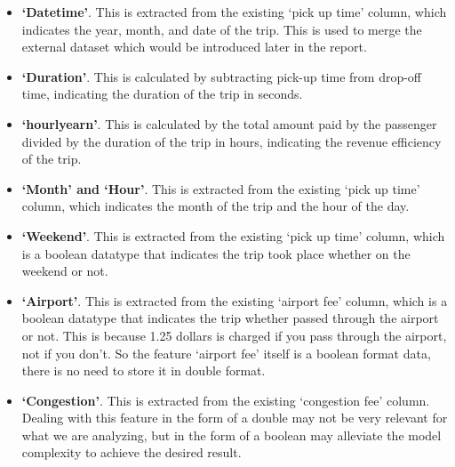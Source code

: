\documentclass[11pt]{article}
\begin{document}
\begin{itemize} 
    \item \textbf{‘Datetime'}. This is extracted from the existing ‘pick up time’ column, which indicates the year, month, and date of the trip. This is used to merge the external dataset which would be introduced later in the report.
    \item \textbf{‘Duration’}. This is calculated by subtracting pick-up time from drop-off time, indicating the duration of the trip in seconds.
    \item \textbf{‘hourly\textunderscore earn’}. This is calculated by the total amount paid by the passenger divided by the duration of the trip in hours, indicating the revenue efficiency of the trip.
    \item \textbf{‘Month’ and ‘Hour’}. This is extracted from the existing ‘pick up time’ column, which indicates the month of the trip and the hour of the day.
    \item \textbf{‘Weekend’}. This is extracted from the existing ‘pick up time’ column, which is a boolean datatype that indicates the trip took place whether on the weekend or not.
    \item \textbf{‘Airport’}. This is extracted from the existing ‘airport fee’ column, which is a boolean datatype that indicates the trip whether passed through the airport or not. This is because 1.25 dollars is charged if you pass through the airport, not if you don't. So the feature ‘airport fee’ itself is a boolean format data, there is no need to store it in double format.
    \item \textbf{‘Congestion’}.  This is extracted from the existing ‘congestion fee’ column. Dealing with this feature in the form of a double may not be very relevant for what we are analyzing, but in the form of a boolean may alleviate the model complexity to achieve the desired result.
\end{itemize} 
\end{document}
